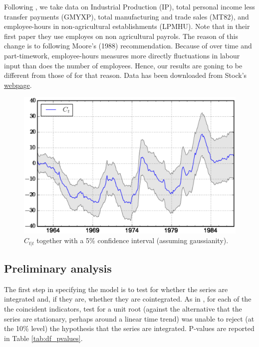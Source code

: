 	Following , we take data on Industrial Production (IP), total personal income less transfer payments (GMYXP), total manufacturing and trade sales (MT82), and employee-hours in non-agricultural establishments (LPMHU). Note that in their first paper \citeyear{stock1988probability} they use employes on non agricultural payrols.  The reason of this change is to following Moore's (1988) recommendation. Because of over time and part-timework, employee-hours measures more directly fluctuations in labour input than does the number of employees. Hence, our results are goning to be different from those of  for that reason. Data has been downloaded from Stock's \href{https://www.princeton.edu/~mwatson/publi.html}{webpage}.  %
\begin{figure}[h!]
	\centering
	\captionsetup{width=0.5\textwidth, font=small}
	\caption{$C_{t|t}$ together with a 5\% confidence interval (assuming gaussianity).}\label{fig:cei}
	\includegraphics[scale=0.5]{fig/sw_CEI}
\end{figure}
	\subsection{Preliminary analysis}
	
	The first step in specifying the model is to test for whether the series are integrated and, if they are, whether they are cointegrated.  As in , for each of the the coincident indicators,  test for a unit root (against the alternative that the series are stationary, perhaps around a linear time trend) was unable to reject (at the 10\% level) the hypothesis that the series are integrated. P-values are reported in Table \ref{tab:df_pvalues}.
	
